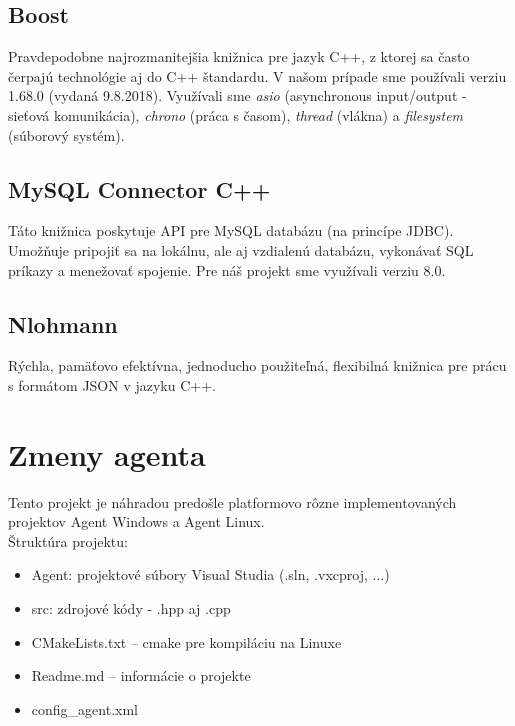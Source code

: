\documentclass[a4paper,12pt]{article}
\begin{document}
\subsection{Boost}

Pravdepodobne najrozmanitejšia knižnica pre jazyk C++, z ktorej sa často čerpajú technológie aj do C++ štandardu. V našom prípade sme používali verziu 1.68.0 (vydaná 9.8.2018). Využívali sme \textit{asio} (asynchronous input/output - sieťová komunikácia), \textit{chrono} (práca s časom), \textit{thread} (vlákna) a \textit{filesystem} (súborový systém).

\subsection{MySQL Connector C++}

Táto knižnica poskytuje API pre MySQL databázu (na princípe JDBC). Umožňuje pripojiť sa na lokálnu, ale aj vzdialenú databázu, vykonávať SQL príkazy a menežovať spojenie. Pre náš projekt sme využívali verziu 8.0.

\subsection{Nlohmann}

Rýchla, pamäťovo efektívna, jednoducho použiteľná, flexibilná knižnica pre prácu s formátom JSON v jazyku C++. 

\section{Zmeny agenta}

Tento projekt je náhradou predošle platformovo rôzne implementovaných projektov Agent Windows a Agent Linux. \\

\noindent Štruktúra projektu:
\begin{itemize} 
	\item Agent: projektové súbory Visual Studia (.sln, .vxcproj, ...) 
	\item src: zdrojové kódy - .hpp aj .cpp 
	\item CMakeLists.txt – cmake pre kompiláciu na Linuxe 
	\item Readme.md – informácie o projekte 
	\item config\_agent.xml \\
\end{itemize}
\end{document}
